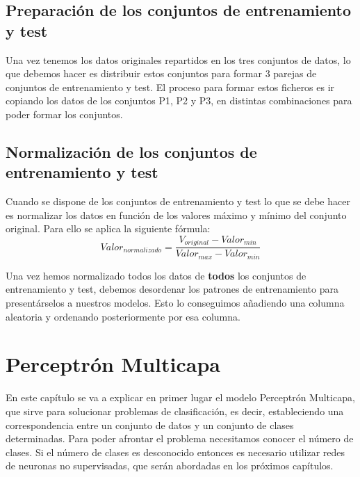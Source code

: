 \documentclass[11pt,spanish,listoffigures,listoftables]{workluis}
\begin{document}
\section{Preparación de los conjuntos de entrenamiento y test}

\par Una vez tenemos los datos originales repartidos en los tres conjuntos de datos, lo que debemos hacer es distribuir estos conjuntos para formar 3 parejas de conjuntos de entrenamiento y test. El proceso para formar estos ficheros es ir copiando los datos de los conjuntos P1, P2 y P3, en distintas combinaciones para poder formar los conjuntos.

\section{Normalización de los conjuntos de entrenamiento y test}

\par Cuando se dispone de los conjuntos de entrenamiento y test lo que se debe hacer es normalizar los datos en función de los valores máximo y mínimo del conjunto original. Para ello se aplica la siguiente fórmula:
\begin{equation}\label{eq:ej}
Valor_{normalizado} = \frac{V_{original} - Valor_{min}}{Valor_{max} - Valor_{min}}
\end{equation}

\par Una vez hemos normalizado todos los datos de \textbf{todos} los conjuntos de entrenamiento y test, debemos desordenar los patrones de entrenamiento para presentárselos a nuestros modelos. Esto lo conseguimos añadiendo una columna aleatoria y ordenando posteriormente por esa columna.

\chapter{Perceptrón Multicapa}

\par En este capítulo se va a explicar en primer lugar el modelo Perceptrón Multicapa, que sirve para solucionar problemas de clasificación, es decir, estableciendo una correspondencia entre un conjunto de datos y un conjunto de clases determinadas. Para poder afrontar el problema necesitamos conocer el número de clases. Si el número de clases es desconocido entonces es necesario utilizar redes de neuronas no supervisadas, que serán abordadas en los próximos capítulos.
\end{document}
